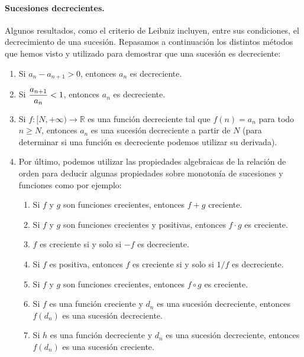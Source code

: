 \paragraph{Sucesiones decrecientes.}
Algunos resultados, como el criterio de Leibniz incluyen, entre sus condiciones, el decrecimiento de una sucesión.
Repasamos a continuación los distintos métodos que hemos visto y utilizado para demostrar que una
sucesión es decreciente:
\begin{enumerate}
\item Si $a_n-a_{n+1}>0$, entonces $a_n$ es decreciente.
\item Si $\dfrac{a_{n+1}}{a_n} <  1$, entonces $a_n$ es decreciente.
\item Si $f\colon [N,+\infty)\to \mathbb{R}$ es una función decreciente tal que $f(n)=a_n$ para
todo $n\geq N$, entonces $a_n$ es una sucesión decreciente a partir de $N$ (para determinar si
una función es decreciente podemos utilizar su derivada).
\item Por último, podemos utilizar las propiedades algebraicas de la relación de orden para deducir algunas propiedades sobre monotonía de sucesiones y
funciones como por ejemplo:
\begin{enumerate}
\item Si $f$ y $g$ son funciones crecientes, entonces $f+g$ creciente.
\item Si $f$ y $g$ son funciones crecientes y positivas, entonces $f\cdot g$ es creciente.
\item $f$ es creciente si y solo si $-f$ es decreciente.
\item Si $f$ es  positiva, entonces $f$ es creciente si y solo si $1/f$ es decreciente.
\item Si $f$ y $g$ son funciones crecientes, entonces $f\circ g$ es creciente.
\item Si $f$ es una función creciente y $\mathit{d}_n$ es una sucesión decreciente, entonces $f(\mathit{d}_n)$ es una sucesión decreciente.
\item Si $h$ es una función decreciente y $\mathit{d}_n$ es una sucesión decreciente, entonces $f(\mathit{d}_n)$ es una sucesión creciente.
\end{enumerate}
\end{enumerate}

